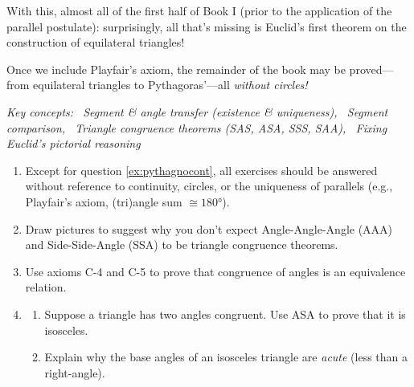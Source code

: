 With this, almost all of the first half of Book I (prior to the application of the parallel postulate): surprisingly, all that's missing is Euclid's first theorem on the construction of equilateral triangles!\par
Once we include Playfair's axiom, the remainder of the book may be proved---from equilateral triangles to Pythagoras'---all \emph{without circles!}



\begin{exercises}
	\hangindent\leftmargini\emph{Key concepts: \ Segment \& angle transfer (existence \& uniqueness), \ Segment comparison, \ Triangle congruence theorems (SAS, ASA, SSS, SAA), \ Fixing Euclid's pictorial reasoning}
	
	
	\begin{enumerate}
	  \item[]Except for question \ref*{ex:pythagnocont}, all exercises should be answered without reference to  continuity, circles, or the uniqueness of parallels (e.g., Playfair's axiom, (tri)angle sum $\cong\ang{180}$).
	  
	  \item\label{exs:aaassano} Draw pictures to suggest why you don't expect Angle-Angle-Angle (AAA) and Side-Side-Angle (SSA) to be triangle congruence theorems.
	  
	  
	  \item\label{exs:angcongequivrel} Use axioms C-4 and C-5 to prove that congruence of angles is an equivalence relation.
	  
	  
	  \item\label{exs:isoconverse}\begin{enumerate}
	    \item Suppose a triangle has two angles congruent. Use ASA to prove that it is isosceles.
	    \item Explain why the base angles of an isosceles triangle are \emph{acute} (less than a right-angle).
	  \end{enumerate}
	  

\end{enumerate}
\end{exercises}
